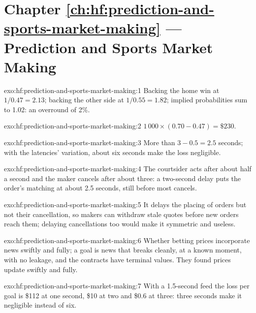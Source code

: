 \section*{Chapter \ref{ch:hf:prediction-and-sports-market-making} --- Prediction and Sports Market Making}

\begin{solution}{exo:hf:prediction-and-sports-market-making:1}
Backing the home win at $1/0.47=2.13$; backing the other side at $1/0.55=1.82$; implied probabilities sum to 1.02: an overround of 2\%.
\end{solution}

\begin{solution}{exo:hf:prediction-and-sports-market-making:2}
$1\,000\times(0.70-0.47)=\$230$.
\end{solution}

\begin{solution}{exo:hf:prediction-and-sports-market-making:3}
More than $3-0.5=2.5$ seconds; with the latencies' variation, about six seconds make the loss negligible.
\end{solution}

\begin{solution}{exo:hf:prediction-and-sports-market-making:4}
The courtsider acts after about half a second and the maker cancels after about three: a two-second delay puts the order's matching at about 2.5
seconds, still before most cancels.
\end{solution}

\begin{solution}{exo:hf:prediction-and-sports-market-making:5}
It delays the placing of orders but not their cancellation, so makers can withdraw stale quotes before new orders reach them; delaying cancellations
too would make it symmetric and useless.
\end{solution}

\begin{solution}{exo:hf:prediction-and-sports-market-making:6}
Whether betting prices incorporate news swiftly and fully; a goal is news that breaks cleanly, at a known moment, with no leakage, and the
contracts have terminal values. They found prices update swiftly and fully.
\end{solution}

\begin{solution}{exo:hf:prediction-and-sports-market-making:7}
With a 1.5-second feed the loss per goal is \$112 at one second, \$10 at two and \$0.6 at three: three seconds make it negligible instead of six.
\end{solution}

